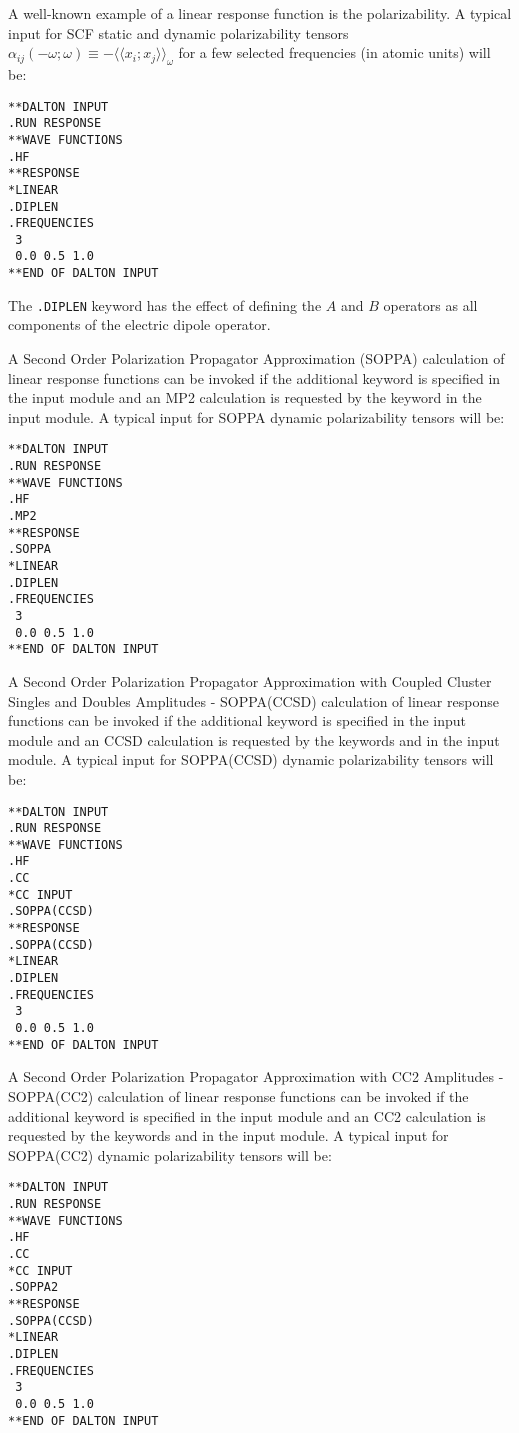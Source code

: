 A well-known example of a linear response
function is the polarizability.
A typical input for SCF static and dynamic polarizability tensors
$\alpha_{ij}(-\omega;\omega)\equiv-\langle\!\langle
x_i;x_j\rangle\!\rangle_\omega$ for a few selected frequencies (in
atomic units) will be:
\begin{verbatim}
**DALTON INPUT
.RUN RESPONSE
**WAVE FUNCTIONS
.HF
**RESPONSE
*LINEAR
.DIPLEN
.FREQUENCIES
 3
 0.0 0.5 1.0
**END OF DALTON INPUT
\end{verbatim}
The {\tt .DIPLEN} keyword has the effect of defining the $A$ and $B$
operators as all components of the electric dipole operator.

A Second Order Polarization Propagator Approximation
(SOPPA)\cite{esnpjjodjcp73,jopjdycpr2,mjpekdtehjajjojcp}
calculation of linear response functions
can be invoked if the additional keyword  is specified in the
 input module and an MP2 calculation is requested by the
keyword  in the  input module.  A typical input
for SOPPA dynamic polarizability tensors  will be:
\begin{verbatim}
**DALTON INPUT
.RUN RESPONSE
**WAVE FUNCTIONS
.HF
.MP2
**RESPONSE
.SOPPA
*LINEAR
.DIPLEN
.FREQUENCIES
 3
 0.0 0.5 1.0
**END OF DALTON INPUT
\end{verbatim}

A Second Order Polarization Propagator Approximation with Coupled
Cluster Singles and Doubles Amplitudes -
SOPPA(CCSD)\cite{soppaccsd} calculation of linear
response functions can be invoked if the additional keyword
 is specified in the  input module and
an CCSD calculation is requested by the keywords  and
 in the  input module.  A typical
input for SOPPA(CCSD) dynamic polarizability tensors  will be:
\begin{verbatim}
**DALTON INPUT
.RUN RESPONSE
**WAVE FUNCTIONS
.HF
.CC
*CC INPUT
.SOPPA(CCSD)
**RESPONSE
.SOPPA(CCSD)
*LINEAR
.DIPLEN
.FREQUENCIES
 3
 0.0 0.5 1.0
**END OF DALTON INPUT
\end{verbatim}

A Second Order Polarization Propagator Approximation with CC2
Amplitudes - SOPPA(CC2)\cite{spas097} calculation of
linear response functions can be invoked if the additional keyword
 is specified in the  input module and
an CC2 calculation is requested by the keywords  and
 in the  input module.  A typical
input for SOPPA(CC2) dynamic polarizability tensors  will be:
\begin{verbatim}
**DALTON INPUT
.RUN RESPONSE
**WAVE FUNCTIONS
.HF
.CC
*CC INPUT
.SOPPA2
**RESPONSE
.SOPPA(CCSD)
*LINEAR
.DIPLEN
.FREQUENCIES
 3
 0.0 0.5 1.0
**END OF DALTON INPUT
\end{verbatim}


